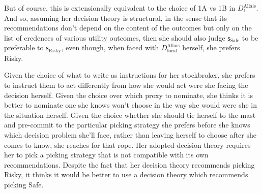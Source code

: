 \documentclass[a4paper]{article}
\newcommand\s{\mathsf{s}}
\renewcommand{\color}[1]{}
\newenvironment{colored}[1]{\leavevmode\color{#1}}{}
\newenvironment{CCM rewritten}
{\begingroup\color{blue}} %
{\endgroup}              %
\begin{document}
But of course, this is extensionally equivalent to the choice of 1A vs 1B in $D^{\mathrm{Allais}}_1$. And so, assuming her decision theory is structural, in the sense that its recommendations don't depend on the content of the outcomes but only on the list of credences of various utility outcomes, then she should also judge $\s_{\mathrm{Safe}}$ to be preferable to $\s_{\mathrm{Risky}}$, even though, when faced with  $D^{\mathrm{Allais}}_{\mathrm{local}}$ herself, she prefers Risky.

Given the choice of what to write as instructions for her stockbroker, she prefers to instruct them to act differently from how she would act were she facing the decision herself. Given the choice over which proxy to nominate, she thinks it is better to nominate one she knows won't choose in the way she would were she in the situation herself. 
Given the choice whether she should tie herself to the mast and pre-commit to the particular picking strategy she prefers before she knows which decision problem she'll face, rather than leaving herself to choose after she comes to know, she reaches for that rope. %
 Her adopted decision theory requires her to pick a picking strategy that is not compatible with its own recommendations. 
Despite the fact that her decision theory recommends picking Risky, it thinks it would be better to use a decision theory which recommends picking Safe.

\end{document}
